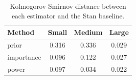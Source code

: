 \begin{table}[h]
\centering
\begin{tabular}{lccc}
\hline
Method & Small & Medium & Large \\
\hline
prior & 0.316 & 0.336 & 0.029 \\
importance & 0.096 & 0.122 & 0.027 \\
power & 0.097 & 0.034 & 0.022 \\
\hline
\end{tabular}
\caption{Kolmogorov-Smirnov distance between each estimator and the Stan baseline.}
\label{tab:ks-comparison}
\end{table}

